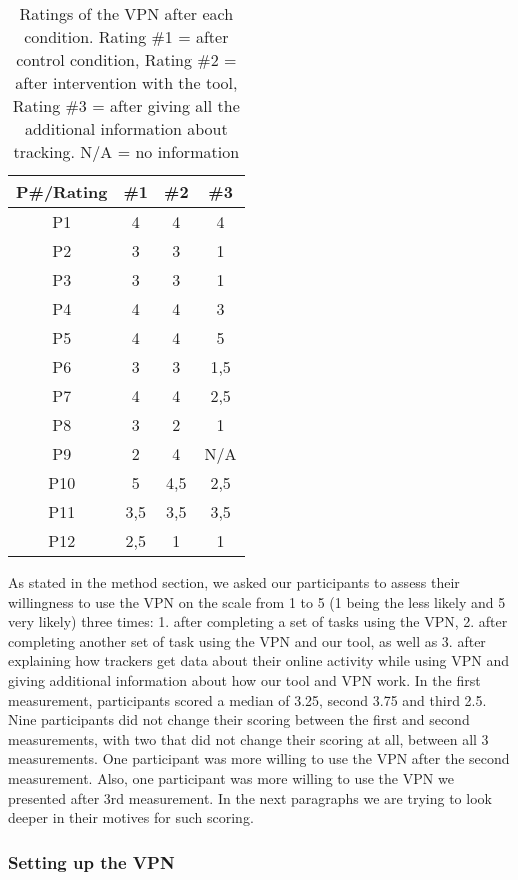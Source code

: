 \begin{table}[h!]
\centering
\begin{tabular}{|c c c c|} 
 \hline
P\#/Rating & \#1 & \#2 & \#3 \\
\hline
P1 & 4 & 4 & 4\\
P2 & 3 & 3 & 1\\
P3 & 3 & 3 & 1\\
P4 & 4 & 4 & 3\\
P5 & 4 & 4 & 5\\
P6 & 3 & 3 & 1,5\\
P7 & 4 & 4 & 2,5\\
P8 & 3 & 2 & 1\\
P9 & 2 & 4 & N/A\\
P10 & 5 & 4,5 & 2,5\\
P11 & 3,5 & 3,5 & 3,5\\
P12 & 2,5 & 1 & 1 \\
 \hline
\end{tabular}
\caption{Ratings of the VPN after each condition. Rating \#1 = after control condition, Rating \#2 = after intervention with the tool, Rating \#3 = after giving all the additional information about tracking. N/A = no information}
\label{table:2}
\end{table}
As stated in the method section, we asked our participants to assess their
willingness to use the VPN on the scale from 1 to 5 (1 being the less likely
and 5 very likely) three times: 1.	after completing a set of tasks using the
VPN, 2.	after completing another set of task using the VPN and our tool, as
well as 3.	after explaining how trackers get data about their online activity
while using VPN and giving additional information about  how our tool and VPN
work.  In the first measurement, participants scored a median of 3.25, second
3.75 and third 2.5. Nine participants did not change their scoring between the
first and second measurements, with two that did not change their scoring at
all, between all 3 measurements. One participant was more willing to use the
VPN after the second measurement. Also, one participant was more willing to
use the VPN we presented after 3rd measurement.  In the next paragraphs we are
trying to look deeper in their motives for such scoring.  
    


\subsubsection{Setting up the VPN}

